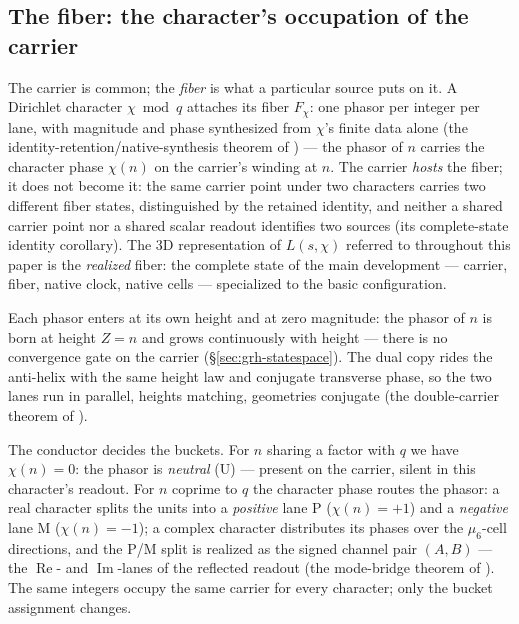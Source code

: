 \documentclass[11pt]{article}
\theoremstyle{definition}
\begin{document}
\subsection{The fiber: the character's occupation of the
carrier}\label{sec:grh-buckets}

The carrier is common; the \emph{fiber} is what a particular source puts on
it. A Dirichlet character \(\chi\bmod q\) attaches its fiber \(F_\chi\): one
phasor per integer per lane, with magnitude and phase synthesized from
\(\chi\)'s finite data alone
(the identity-retention/native-synthesis theorem of
\cite{UniversalCarrier}) --- the phasor of \(n\) carries
the character phase \(\chi(n)\) on the carrier's winding at \(n\). The
carrier \emph{hosts} the fiber; it does not become it: the same carrier point
under two characters carries two different fiber states, distinguished by the
retained identity, and neither a shared carrier point nor a shared scalar
readout identifies two sources
(its complete-state identity corollary). The 3D representation of
\(L(s,\chi)\) referred to throughout this paper is the \emph{realized} fiber:
the complete state of the main development \cite{UniversalCarrier} ---
carrier, fiber, native clock, native cells --- specialized to the basic
configuration.

Each phasor enters at its own height and at zero magnitude: the phasor of
\(n\) is born at height \(Z=n\) and grows continuously with height ---
there is no convergence gate on the carrier
(\S\ref{sec:grh-statespace}). The dual copy rides the anti-helix with the
same height law and conjugate transverse phase, so the two lanes run in
parallel, heights matching, geometries conjugate
(the double-carrier theorem of \cite{UniversalCarrier}).

The conductor decides the buckets. For \(n\) sharing a factor with \(q\) we
have \(\chi(n)=0\): the phasor is \emph{neutral} (U) --- present on the
carrier, silent in this character's readout. For \(n\) coprime to \(q\) the
character phase routes the phasor: a real character splits the units into a
\emph{positive} lane P (\(\chi(n)=+1\)) and a \emph{negative} lane M
(\(\chi(n)=-1\)); a complex character distributes its phases over the
\(\mu_6\)-cell directions, and the P/M split is realized as the signed channel
pair \((A,B)\) --- the \(\operatorname{Re}\)- and \(\operatorname{Im}\)-lanes
of the reflected readout (the mode-bridge theorem of
\cite{UniversalCarrier}). The same integers
occupy the same carrier for every character; only the bucket assignment
changes. 
\end{document}
